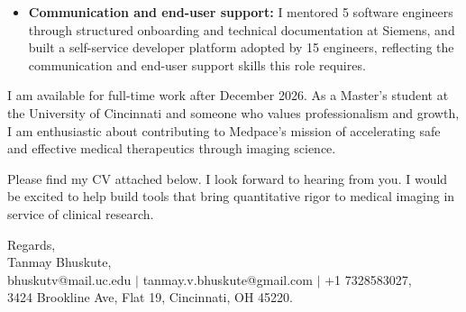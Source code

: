 \documentclass[11pt]{letter}
\begin{document}
\begin{letter}{}
\begin{itemize}[leftmargin=*, itemsep=0.45em]
    \item \textbf{Communication and end-user support:} I mentored 5 software engineers through structured onboarding and technical documentation at Siemens, and built a self-service developer platform adopted by 15 engineers, reflecting the communication and end-user support skills this role requires.
\end{itemize}

I am available for full-time work after December 2026. As a Master's student at the University of Cincinnati and someone who values professionalism and growth, I am enthusiastic about contributing to Medpace's mission of accelerating safe and effective medical therapeutics through imaging science.

Please find my CV attached below. I look forward to hearing from you. I would be excited to help build tools that bring quantitative rigor to medical imaging in service of clinical research.

{\setlength{\parskip}{0pt}
Regards,\\
Tanmay Bhuskute,\\
bhuskutv@mail.uc.edu $\mid$ tanmay.v.bhuskute@gmail.com $\mid$ +1 7328583027,\\
3424 Brookline Ave, Flat 19, Cincinnati, OH 45220.
}

\end{letter}
\end{document}
